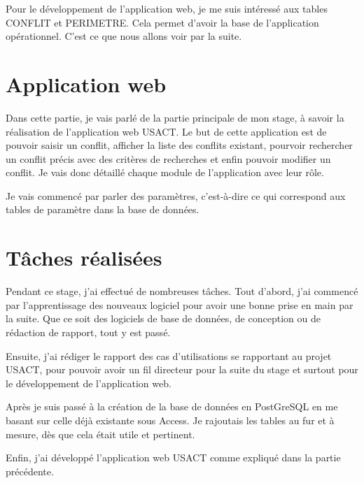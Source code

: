 \documentclass[12pt,a4paper,titlepage,twoside]{report}
\begin{document}
Pour le développement de l'application web, je me suis intéressé aux tables CONFLIT et PERIMETRE. Cela permet d'avoir la base de l'application opérationnel. C'est ce que nous allons voir par la suite.

\clearpage
\section{Application web}
Dans cette partie, je vais parlé de la partie principale de mon stage, à savoir la réalisation de l'application web USACT. Le but de cette application est de pouvoir saisir un conflit, afficher la liste des conflits existant, pourvoir rechercher un conflit précis avec des critères de recherches et enfin pouvoir modifier un conflit.\newline
Je vais donc détaillé chaque module de l'application avec leur rôle.\newline\newline

Je vais commencé par parler des paramètres, c'est-à-dire ce qui correspond aux tables de paramètre dans la base de données.

\section{Tâches réalisées}
Pendant ce stage, j'ai effectué de nombreuses tâches. Tout d'abord, j'ai commencé par l'apprentissage des nouveaux logiciel pour avoir une bonne prise en main par la suite. Que ce soit des logiciels de base de données, de conception ou de rédaction de rapport, tout y est passé. \newline\newline

Ensuite, j'ai rédiger le rapport des cas d'utilisations se rapportant au projet USACT, pour pouvoir avoir un fil directeur pour la suite du stage et surtout pour le développement de l'application web.\newline\newline

Après je suis passé à la création de la base de données en PostGreSQL en me basant sur celle déjà existante sous Access. Je rajoutais les tables au fur et à mesure, dès que cela était utile et pertinent. \newline\newline

Enfin, j'ai développé l'application web USACT comme expliqué dans la partie précédente.
\end{document}
